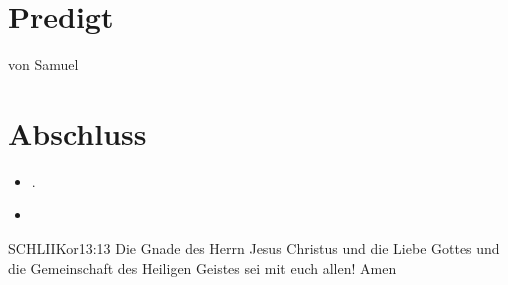 \documentclass[fontsize=14pt]{mybib}
\newcommand{\Name}{Samuel}
\begin{document}
\section{Predigt}
    von \Name{}

\section{Abschluss}
\begin{itemize}
    \item [] .
    \item [] 
\end{itemize}
\begin{bibelbox}{SCHL}{IIKor}{13:13}
    Die Gnade des Herrn Jesus Christus und die Liebe Gottes und die Gemeinschaft des Heiligen Geistes sei mit euch allen! Amen
\end{bibelbox}
\end{document}
